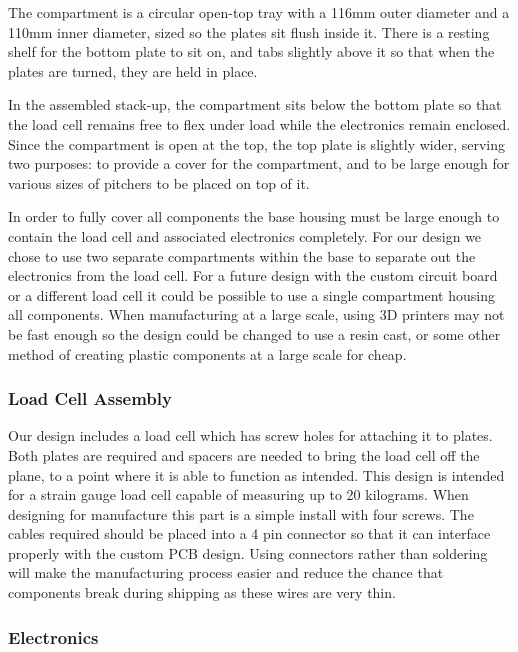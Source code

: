 The compartment is a circular open-top tray with a 116mm outer diameter and a 110mm inner diameter, sized so the plates sit flush inside it. There is a resting shelf for the bottom plate to sit on, and tabs slightly above it so that when the plates are turned, they are held in place.

In the assembled stack-up, the compartment sits below the bottom plate so that the load cell remains free to flex under load while the electronics remain enclosed. Since the compartment is open at the top, the top plate is slightly wider, serving two purposes: to provide a cover for the compartment, and to be large enough for various sizes of pitchers to be placed on top of it.

In order to fully cover all components the base housing must be large enough to contain the load cell and associated electronics completely. For our design we chose to use two separate compartments within the base to separate out the electronics from the load cell. For a future design with the custom circuit board or a different load cell it could be possible to use a single compartment housing all components. When manufacturing at a large scale, using 3D printers may not be fast enough so the design could be changed to use a resin cast, or some other method of creating plastic components at a large scale for cheap. 


\subsubsection{Load Cell Assembly}

Our design includes a load cell which has screw holes for attaching it to plates. Both plates are required and spacers are needed to bring the load cell off the plane, to a point where it is able to function as intended. This design is intended for a strain gauge load cell capable of measuring up to 20 kilograms. When designing for manufacture this part is a simple install with four screws. The cables required should be placed into a 4 pin connector so that it can interface properly with the custom PCB design. Using connectors rather than soldering will make the manufacturing process easier and reduce the chance that components break during shipping as these wires are very thin. 

\subsubsection{Electronics}


